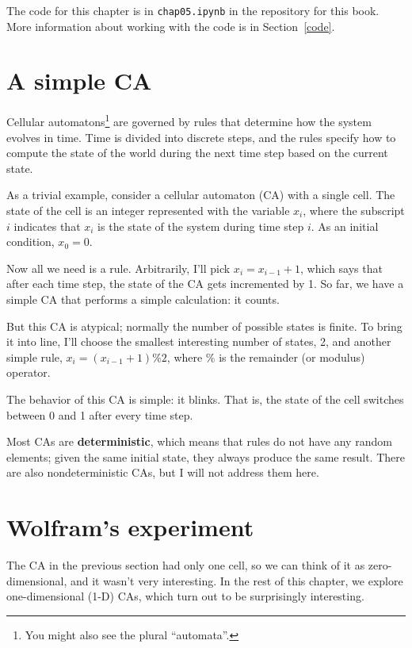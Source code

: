 \documentclass[12pt]{book}
\theoremstyle{exercise}
\begin{document}
The code for this chapter is in {\tt chap05.ipynb} in the repository
for this book.  More information about working with the code is
in Section~\ref{code}.


\section{A simple CA}

Cellular automatons\footnote{You might also see the plural
  ``automata''.} are governed by rules that determine how the system
evolves in time.  Time is divided into discrete steps, and the rules
specify how to compute the state of the world during the next time
step based on the current state.


As a trivial example, consider a cellular automaton (CA) with
a single cell.  The state of the cell is an integer represented
with the variable $x_i$, where the subscript $i$ indicates
that $x_i$ is the state of the system during time step $i$.
As an initial condition, $x_0 = 0$.

Now all we need is a rule.  Arbitrarily, I'll pick $x_i = x_{i-1} + 1$,
which says that after each time step, the state of the CA gets
incremented by 1.  So far, we have a simple CA that performs
a simple calculation: it counts.

But this CA is atypical; normally the number of
possible states is finite.  To bring it into line, I'll choose the
smallest interesting number of states, 2, and another simple rule,
$x_i = (x_{i-1} + 1) \% 2$, where $\%$ is the remainder (or
modulus) operator.

The behavior of this CA is simple: it blinks.  That is,
the state of the cell switches between 0 and 1 after every time step.

Most CAs are {\bf deterministic}, which means that rules do not
have any random elements; given the same initial state, they
always produce the same result.  There are also nondeterministic
CAs, but I will not address them here.


\section{Wolfram's experiment}
\label{onedim}

The CA in the previous section had only one cell, so we can think of
it as zero-dimensional, and it wasn't very interesting.  In the rest
of this chapter, we explore one-dimensional (1-D) CAs, which turn out to
be surprisingly interesting.
\end{document}
